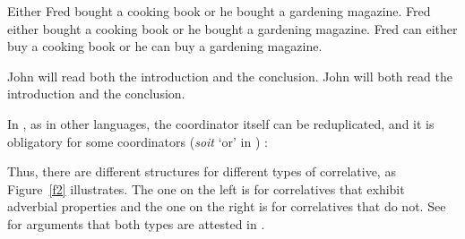 \eal
\ex  Either Fred bought a cooking book or he bought a gardening magazine.
\ex  Fred either bought a cooking book or he bought a gardening magazine.
\ex  Fred can either buy a cooking book or he can buy a gardening magazine.
\zl
{}

\eal
\ex John will read both the introduction and the conclusion.
\ex John will both read the introduction and the conclusion.
\zl



\noindent
In , as in other  languages, the coordinator itself can be reduplicated, and it is
obligatory for some coordinators (\emph{soit} `or' in ) \parencites{Mouret:05}[--206]{Bilbiie:17}:

\eal
{}
\zl

\noindent
Thus, there are  different structures for different types of correlative, as Figure~\ref{f2} illustrates. The one on the left is for correlatives that exhibit adverbial properties and the one on the right is for correlatives that do not.
See \citet[--36]{Bilbiie:08} for arguments that both types are attested in .




